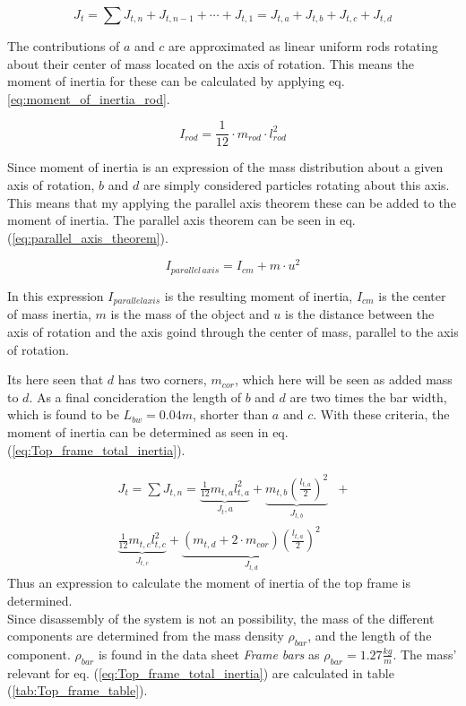 \documentclass[../../main]{subfiles}
\begin{document}
\begin{equation}
  \label{eq:Top_frame_total_inertia_formula}
  J_t = \sum J_{t,n} + J_{t,n-1} + \dotsb + J_{t,1} = J_{t,a} + J_{t,b} + J_{t,c} + J_{t,d}
\end{equation}

The contributions of $a$ and $c$ are approximated as linear uniform rods rotating about their center of mass located on the axis of rotation. This means the moment of inertia for these can be calculated by applying eq. \ref{eq:moment_of_inertia_rod}.

\begin{equation}
  \label{eq:moment_of_inertia_rod}
  I_{rod}=\frac{1}{12}\cdot m_{rod} \cdot l_{rod}^2
\end{equation}

Since moment of inertia is an expression of the mass distribution about a given axis of rotation, $b$ and $d$ are simply considered particles rotating about this axis. This means that my applying the parallel axis theorem these can be added to the moment of inertia. The parallel axis theorem can be seen in eq. (\ref{eq:parallel_axis_theorem}).

\begin{equation}
  \label{eq:parallel_axis_theorem}
  I_{parallel\,axis} = I_{cm} + m\cdot u^2
\end{equation}

In this expression $I_{parallel axis}$ is the resulting moment of inertia, $I_{cm}$ is the center of mass inertia, $m$ is the mass of the object and $u$ is the distance between the axis of rotation and the axis goind through the center of mass, parallel to the axis of rotation.

Its here seen that $d$ has two corners, $m_{cor}$, which here will be seen as added mass to $d$. As a final concideration the length of $b$ and $d$ are two times the bar width, which is found to be $L_{bw} = 0.04m$, shorter than $a$ and $c$. With these criteria, the moment of inertia can be determined as seen in eq. (\ref{eq:Top_frame_total_inertia}).

\begin{equation}
  \label{eq:Top_frame_total_inertia}
\begin{split}
  J_t = \sum J_{t,n} =
  \underbrace{\frac{1}{12}m_{t,a}l_{t,a}^2}_\text{$J_t,a$} +
  \underbrace{m_{t,b}\left(\frac{l_{t,a}}{2}\right)^2}_\text{$J_{t,b}$} &+ \\
  \underbrace{ \frac{1}{12} m_{t,c}l_{t,c}^2}_\text{$J_{t,c}$} +
  \underbrace{(m_{t,d} + 2\cdot m_{cor})\left(\frac{l_{t,a}}{2}\right)^2}_\text{$J_{t,d}$}
\end{split}
\end{equation}
Thus an expression to calculate the moment of inertia of the top frame is determined.\\
Since disassembly of the system is not an possibility, the mass of the different components are determined from the mass density $\rho_{bar}$, and the length of the component. $\rho_{bar}$ is found in the data sheet \textit{Frame bars} as $\rho_{bar} = 1.27 \si{\frac{kg}{m}}$. The mass' relevant for eq. (\ref{eq:Top_frame_total_inertia}) are calculated in table (\ref{tab:Top_frame_table}).
\end{document}
